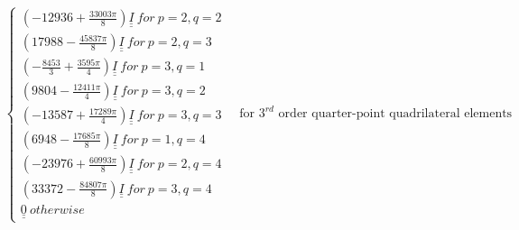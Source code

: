 \documentclass[a4paper]{jpconf}
\begin{document}
\begin{equation}
\begin{split}
\begin{cases}
\left(-12936+\frac{33003\pi}{8}\right)\underline{\underline{I}}\ for\ p=2,q=2\\
\left(17988-\frac{45837\pi}{8}\right)\underline{\underline{I}}\ for\ p=2,q=3\\
\left(-\frac{8453}{3}+\frac{3595\pi}{4}\right)\underline{\underline{I}}\ for\ p=3,q=1\\
\left(9804-\frac{12411\pi}{4}\right)\underline{\underline{I}}\ for\ p=3,q=2\\
\left(-13587+\frac{17289\pi}{4}\right)\underline{\underline{I}}\ for\ p=3,q=3\\
\left(6948-\frac{17685\pi}{8}\right)\underline{\underline{I}}\ for\ p=1,q=4\\
\left(-23976+\frac{60993\pi}{8}\right)\underline{\underline{I}}\ for\ p=2,q=4\\
\left(33372-\frac{84807\pi}{8}\right)\underline{\underline{I}}\ for\ p=3,q=4\\
\underline{\underline{0}}\ otherwise
\end{cases}\quad \text{for $3^{rd}$ order quarter-point quadrilateral elements}\\
\end{split}
\end{equation}


\end{document}
